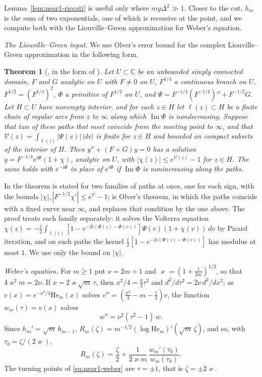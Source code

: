 \documentclass[11pt]{amsart}
\newtheorem{theorem}{Theorem}[section]
\theoremstyle{definition}
\theoremstyle{remark}
\numberwithin{equation}{section}
\newcommand{\C}{\mathbb{C}}
\newcommand{\He}{\mathrm{He}}
\DeclareMathOperator{\im}{Im}
\begin{document}
Lemma~\ref{lem:near1-riccati} is useful only where $my\Delta^2\gg1$. Closer to the cut, $h_m$ is the sum of two exponentials, one of which is recessive at the point, and we compute both with the Liouville--Green approximation for Weber's equation.

\emph{The Liouville--Green input.} We use Olver's error bound for the complex Liouville--Green approximation in the following form.

\begin{theorem}[{\cite[Chapter~6, Theorem~11.1]{Ol}, in the form of \cite[Theorem~2]{SV}}]\label{thm:near1-LG}
Let $U\subset\C$ be an unbounded simply connected domain, $F$ and $G$ analytic on $U$ with $F\ne0$ on $U$, $F^{1/4}$ a continuous branch on $U$, $F^{1/2}=(F^{1/4})^2$, $\Phi$ a primitive of $F^{1/2}$ on $U$, and $\Psi=F^{-1/4}(F^{-1/4})''+F^{-1/2}G$. Let $H\subset U$ have nonempty interior, and for each $z\in H$ let $\ell(z)\subset H$ be a finite chain of regular arcs from $z$ to $\infty$ along which $\im\Phi$ is nondecreasing. Suppose that two of these paths that meet coincide from the meeting point to $\infty$, and that $\mathcal V(z)=\int_{\ell(z)}|\Psi(v)|\,|dv|$ is finite for $z\in H$ and bounded on compact subsets of the interior of $H$. Then $y''+(F+G)y=0$ has a solution $y=F^{-1/4}e^{i\Phi}(1+\chi)$, analytic on $U$, with $|\chi(z)|\le e^{\mathcal V(z)}-1$ for $z\in H$. The same holds with $e^{-i\Phi}$ in place of $e^{i\Phi}$ if $\im\Phi$ is nonincreasing along the paths.
\end{theorem}

In \cite{SV} the theorem is stated for two families of paths at once, one for each sign, with the bounds $|\chi|,|F^{-1/2}\chi'|\le e^{\mathcal V}-1$; \cite[Theorem~1]{SV} is Olver's theorem, in which the paths coincide with a fixed curve near $\infty$, and \cite[Theorem~2]{SV} replaces that condition by the one above. The proof \cite[pp.~215--216]{SV} treats each family separately: it solves the Volterra equation $\chi(z)=-\frac i2\int_{\ell(z)}[1-e^{-2i(\Phi(z)-\Phi(v))}]\Psi(v)(1+\chi(v))\,dv$ by Picard iteration, and on such paths the kernel $\frac i2[1-e^{-2i(\Phi(z)-\Phi(v))}]$ has modulus at most $1$. We use only the bound on $|\chi|$.

\emph{Weber's equation.} For $m\ge1$ put $\nu=2m+1$ and $\varkappa=(1+\frac1{2m})^{1/2}$, so that $4\varkappa^2m=2\nu$. If $x=2\varkappa\sqrt m\,\tau$, then $x^2/4=\frac\nu2\tau^2$ and $d^2/d\tau^2=2\nu\,d^2/dx^2$; as $v(x)=e^{-x^2/4}\He_m(x)$ solves $v''=(\frac{x^2}4-m-\frac12)v$, the function $w_m(\tau)=v(x)$ solves
\begin{equation}\label{eq:near1-weber}
w''=\nu^2(\tau^2-1)\,w .
\end{equation}
Since $h_m'=\sqrt m\,h_{m-1}$, $R_m(\zeta)=m^{-1/2}(\log\He_m)'(\sqrt m\,\zeta)$, and so, with $\tau_0=\zeta/(2\varkappa)$,
\[
R_m(\zeta)=\frac\zeta2+\frac1{2\varkappa m}\,\frac{w_m'(\tau_0)}{w_m(\tau_0)}.
\]
The turning points of \eqref{eq:near1-weber} are $\tau=\pm1$, that is $\zeta=\pm2\varkappa$.
\end{document}
